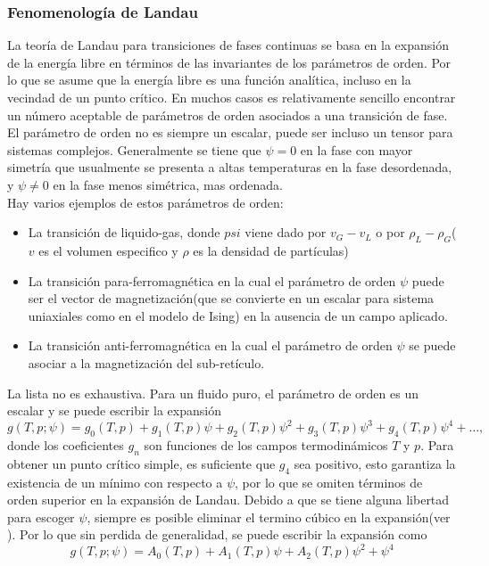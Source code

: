 \documentclass[a4paper]{article}
\begin{document}
\subsubsection{Fenomenología de Landau}
La teoría de Landau para transiciones de fases continuas se basa en la expansión de la energía libre en términos de las invariantes de los parámetros de orden. Por lo que se asume que la energía libre es una función analítica, incluso en la vecindad de un punto crítico. En muchos casos es relativamente sencillo  encontrar un número aceptable  de parámetros de orden asociados a una transición de fase. El parámetro de orden no es siempre un escalar, puede ser incluso un tensor para sistemas complejos. Generalmente se tiene que $\psi=0$ en la fase con mayor simetría que usualmente se presenta a altas temperaturas en la fase desordenada, y $\psi\neq0$ en la fase menos simétrica, mas ordenada.\\
Hay varios ejemplos de estos parámetros de orden:
\begin{itemize}
\item La transición de liquido-gas, donde $psi$ viene dado por $v_G-v_L$ o por $\rho_L-\rho_G$($v$ es el volumen especifico y $\rho$ es la densidad de partículas)
\item La transición para-ferromagnética en la cual el parámetro de orden $\psi$ puede ser el vector de magnetización(que se convierte en un escalar para sistema uniaxiales como en el modelo de Ising) en la ausencia de un campo aplicado.
\item La transición anti-ferromagnética  en la cual el parámetro de orden $\psi$ se puede asociar a la magnetización del sub-retículo.
\end{itemize}
La lista no es exhaustiva. Para un fluido puro, el parámetro de orden es un escalar y se puede escribir la expansión
\begin{equation}
g(T,p;\psi)=g_0(T,p)+g_1(T,p)\psi+g_2(T,p)\psi^2+g_3(T,p)\psi^3+g_4(T,p)\psi^4+\hdots,
\end{equation}
donde los coeficientes $g_n$ son funciones de los campos termodinámicos $T$ y $p$. Para obtener un punto crítico simple, es suficiente que $g_4$ sea positivo, esto garantiza la existencia de un mínimo con respecto a $\psi$, por lo que se omiten términos de orden superior en la expansión de Landau. Debido a que se tiene alguna libertad para escoger $\psi$, siempre es posible eliminar el termino cúbico en la expansión(ver \cite{Salinas}). Por lo que sin perdida de generalidad, se puede escribir la expansión como
\begin{equation}
g(T,p;\psi)=A_0(T,p)+A_1(T,p)\psi+A_2(T,p)\psi^2+\psi^4
\end{equation}
\end{document}
